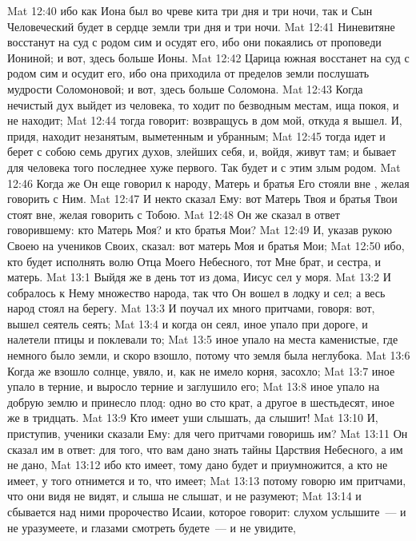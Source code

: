 \vs Mat 12:40 ибо как Иона был во чреве кита три дня и три ночи, так и Сын Человеческий будет в сердце земли три дня и три ночи.
\vs Mat 12:41 Ниневитяне восстанут на суд с родом сим и осудят его, ибо они покаялись от проповеди Иониной; и вот, здесь больше Ионы.
\vs Mat 12:42 Царица южная восстанет на суд с родом сим и осудит его, ибо она приходила от пределов земли послушать мудрости Соломоновой; и вот, здесь больше Соломона.
\vs Mat 12:43 Когда нечистый дух выйдет из человека, то ходит по безводным местам, ища покоя, и не находит;
\vs Mat 12:44 тогда говорит: возвращусь в дом мой, откуда я вышел. И, придя, находит  незанятым, выметенным и убранным;
\vs Mat 12:45 тогда идет и берет с собою семь других духов, злейших себя, и, войдя, живут там; и бывает для человека того последнее хуже первого. Так будет и с этим злым родом.
\rsbpar\vs Mat 12:46 Когда же Он еще говорил к народу, Матерь и братья Его стояли вне , желая говорить с Ним.
\vs Mat 12:47 И некто сказал Ему: вот Матерь Твоя и братья Твои стоят вне, желая говорить с Тобою.
\vs Mat 12:48 Он же сказал в ответ говорившему: кто Матерь Моя? и кто братья Мои?
\vs Mat 12:49 И, указав рукою Своею на учеников Своих, сказал: вот матерь Моя и братья Мои;
\vs Mat 12:50 ибо, кто будет исполнять волю Отца Моего Небесного, тот Мне брат, и сестра, и матерь.
\vs Mat 13:1 Выйдя же в день тот из дома, Иисус сел у моря.
\vs Mat 13:2 И собралось к Нему множество народа, так что Он вошел в лодку и сел; а весь народ стоял на берегу.
\vs Mat 13:3 И поучал их много притчами, говоря: вот, вышел сеятель сеять;
\vs Mat 13:4 и когда он сеял, иное упало при дороге, и налетели птицы и поклевали то;
\vs Mat 13:5 иное упало на места каменистые, где немного было земли, и скоро взошло, потому что земля была неглубока.
\vs Mat 13:6 Когда же взошло солнце, увяло, и, как не имело корня, засохло;
\vs Mat 13:7 иное упало в терние, и выросло терние и заглушило его;
\vs Mat 13:8 иное упало на добрую землю и принесло плод: одно во сто крат, а другое в шестьдесят, иное же в тридцать.
\vs Mat 13:9 Кто имеет уши слышать, да слышит!
\vs Mat 13:10 И, приступив, ученики сказали Ему: для чего притчами говоришь им?
\vs Mat 13:11 Он сказал им в ответ: для того, что вам дано знать тайны Царствия Небесного, а им не дано,
\vs Mat 13:12 ибо кто имеет, тому дано будет и приумножится, а кто не имеет, у того отнимется и то, что имеет;
\vs Mat 13:13 потому говорю им притчами, что они видя не видят, и слыша не слышат, и не разумеют;
\vs Mat 13:14 и сбывается над ними пророчество Исаии, которое говорит: слухом услышите~--- и не уразумеете, и глазами смотреть будете~--- и не увидите,
